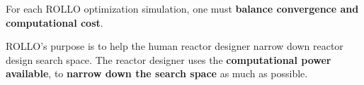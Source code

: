 \begin{frame}
    For each ROLLO optimization simulation, one must \textbf{balance convergence and 
    computational cost}. 

    ROLLO's purpose is to help the human reactor designer narrow down reactor design 
    search space. The reactor designer uses the \textbf{computational power 
    available}, to \textbf{narrow down the search space} as much as possible.
\end{frame}
